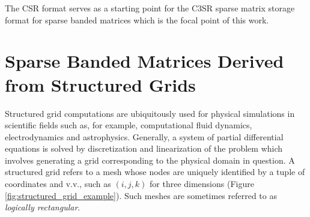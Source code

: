     The CSR format serves as a starting point for the C3SR sparse matrix storage format for sparse banded matrices which
    is the focal point of this work.

  \section{Sparse Banded Matrices Derived from Structured Grids} \label{sec:structured-grid-matrices}

    Structured grid computations are ubiquitously used for physical simulations in scientific fields such as, for
    example, computational fluid dynamics, electrodynamics and astrophysics. Generally, a system of partial differential
    equations is solved by discretization and linearization of the problem which involves generating a grid
    corresponding to the physical domain in question. A structured grid refers to a mesh whose nodes are uniquely
    identified by a tuple of coordinates and v.v., such as $(i, j, k)$ for three dimensions (Figure
    \ref{fig:structured_grid_example}). Such meshes are sometimes referred to as \emph{logically rectangular}.

